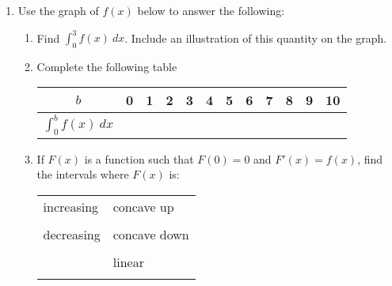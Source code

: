 \documentclass[letterpaper,11pt]{article}
\begin{document}
\begin{enumerate}
    \item Use the graph of $f(x)$ below to answer the following:
    \begin{center}
    \end{center}
    \begin{enumerate}
        \item Find $\int_0^3 f(x) \ dx$. Include an illustration of this quantity on the graph.
        \vfill
        \item Complete the following table
        \begin{center}
        \begin{tabular}{|c|c|c|c|c|c|c|c|c|c|c|c|}
            \hline
            $b$ & 0 & 1 & 2 & 3 & 4 & 5 & 6 & 7 & 8 & 9 & 10 \\
            \hline 
            $\displaystyle \int_0^b f(x) \ dx$ & & & & & & & & & & & \\
            \hline
        \end{tabular}
        \end{center}
        \vfill
        \newpage
        \item If $F(x)$ is a function such that $F(0) = 0$ and $F'(x) = f(x)$, find the intervals where $F(x)$ is:
        
        \begin{tabularx}{\textwidth}{p{3in} p{3in}}
            increasing & concave up \\
            & \\
            decreasing & concave down \\
            & \\
            & linear \\
            & \\
        \end{tabularx}


\end{enumerate}
\end{enumerate}
\end{document}
